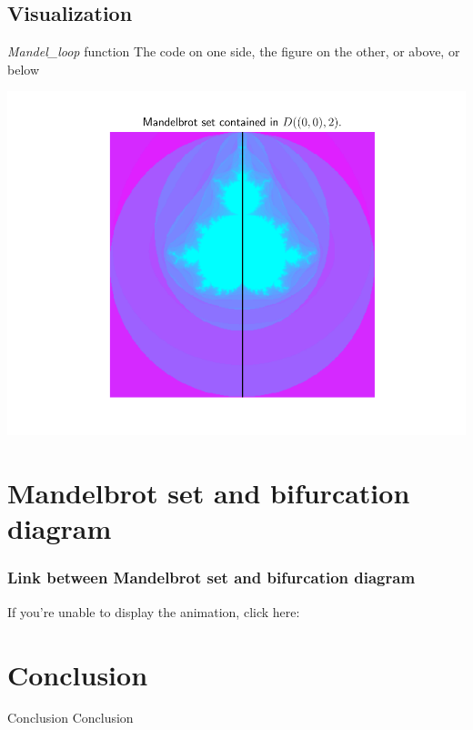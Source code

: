 \documentclass[11pt, compress,tikz]{beamer}
\theoremstyle{definition}
\begin{document}
\subsection{Visualization}
\begin{frame}{\emph{Mandel\_loop } function}
The code on one side, the figure on the other, or above, or below


\begin{center}
    \includegraphics[scale=0.55]{mandelbrot.pdf}
\end{center}
\end{frame}




\section[Link]{Mandelbrot set and bifurcation diagram}

\begin{frame}
\frametitle{Link between Mandelbrot set and bifurcation diagram}
If you're unable to display the animation, click here:
\href{https://www.youtube.com/watch?v=xYQbqML1eE4}{}


\end{frame}

\section[]{Conclusion}
\begin{frame}{Conclusion}
Conclusion
\end{frame}      
\end{document}
